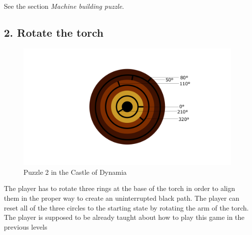 
%

%

See the section \textit{Machine building puzzle}.

\subsection{2. Rotate the torch}

\begin{figure}[H]
  \centering
  \includegraphics[width=\textwidth]{Images/Puzzles/torchPuzzleStart}
  \caption{Puzzle 2 in the Castle of Dynamia}
\end{figure}

The player has to rotate three rings at the base of the torch in order to align them in the proper way to create an uninterrupted black path. The player can reset all of the three circles to the starting state by rotating the arm of the torch. The player is supposed to be already taught about how to play this game in the previous levels

